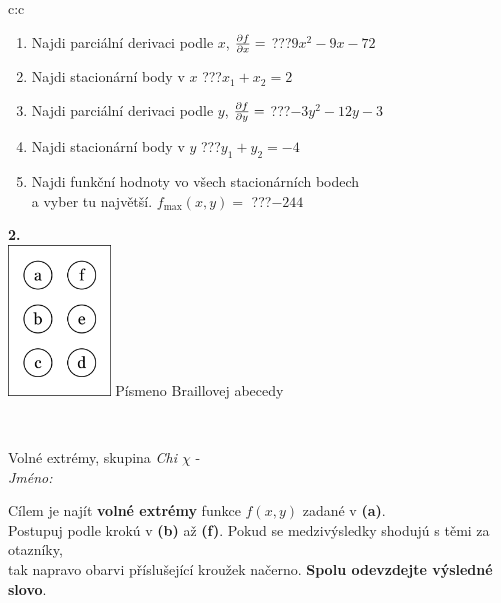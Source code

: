 \documentclass[10pt]{report}
\begin{document}
\begin{tabular}{c:c}
\begin{minipage}[c][104.5mm][t]{0.5\linewidth}
\begin{center}
\begin{minipage}{0.79\linewidth}
\begin{center}
\begin{varwidth}{\linewidth}
\begin{enumerate}
\item Najdi parciální derivaci podle $x$, $\pdv{f}{x}=$\quad \dotfill\; ???\;\dotfill \quad $9x^2-9x-72$
\item Najdi stacionární body v $x$\quad \dotfill\; ???\;\dotfill \quad $x_1+x_2=2$
\item Najdi parciální derivaci podle $y$, $\pdv{f}{y}=$\quad \dotfill\; ???\;\dotfill \quad $-3y^2-12y-3$
\item Najdi stacionární body v $y$\quad \dotfill\; ???\;\dotfill \quad $y_1+y_2=-4$
\item Najdi funkční hodnoty vo všech stacionárních bodech \\ \phantom{xxxxxx} a vyber tu najvětší. $f_{\text{max}}(x,y)=$\quad \dotfill\; ???\;\dotfill \quad $-244$
\end{enumerate}
\end{varwidth}
\end{center}
\end{minipage}
\begin{minipage}{0.20\linewidth}
\begin{center}
{\Huge\bfseries 2.} \\[2mm]
\includegraphics[height=40mm]{../images/braille.png}
{\small Písmeno Braillovej abecedy}
\end{center}
\end{minipage}
\end{center}
\end{minipage}
\\ \hdashline
\begin{minipage}[c][104.5mm][t]{0.5\linewidth}
\begin{center}
\vspace{7mm}
{\huge Volné extrémy, skupina \textit{Chi $\chi$} -}\\[5mm]
\textit{Jméno:}\phantom{xxxxxxxxxxxxxxxxxxxxxxxxxxxxxxxxxxxxxxxxxxxxxxxxxxxxxxxxxxxxxxxxx}\\[5mm]
\begin{minipage}{0.95\linewidth}
\begin{center}
Cílem je najít \textbf{volné extrémy} funkce $f(x,y)$ zadané v \textbf{(a)}.\\Postupuj podle krokú v \textbf{(b)} až \textbf{(f)}. Pokud se medzivýsledky shodujú s těmi za otazníky,\\tak napravo obarvi příslušející kroužek načerno. \textbf{Spolu odevzdejte výsledné slovo}.

\end{center}
\end{minipage}
\end{center}
\end{minipage}
\end{tabular}
\end{document}
